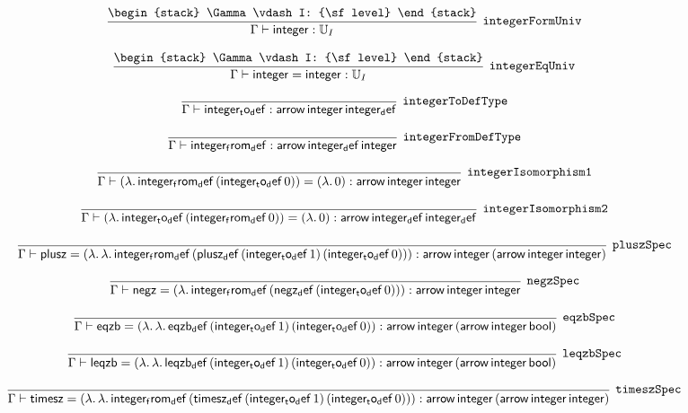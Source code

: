 \[
\infer[{\tt integerFormUniv}]{\Gamma \vdash {\sf integer}: {\Bbb U}_{I}}{
\begin{stack}
\Gamma \vdash I: {\sf level}
\end{stack}}
\]

\[
\infer[{\tt integerEqUniv}]{\Gamma \vdash {\sf integer}= {\sf integer}: {\Bbb U}_{I}}{
\begin{stack}
\Gamma \vdash I: {\sf level}
\end{stack}}
\]

\[
\infer[{\tt integerToDefType}]{\Gamma \vdash {\sf integer_to_def}: {\sf arrow}\,{\sf integer}\,{\sf integer_def}}{}
\]

\[
\infer[{\tt integerFromDefType}]{\Gamma \vdash {\sf integer_from_def}: {\sf arrow}\,{\sf integer_def}\,{\sf integer}}{}
\]

\[
\infer[{\tt integerIsomorphism1}]{\Gamma \vdash (\lambda .\,{\sf integer_from_def}\,({\sf integer_to_def}\,0))= (\lambda .\,0): {\sf arrow}\,{\sf integer}\,{\sf integer}}{}
\]

\[
\infer[{\tt integerIsomorphism2}]{\Gamma \vdash (\lambda .\,{\sf integer_to_def}\,({\sf integer_from_def}\,0))= (\lambda .\,0): {\sf arrow}\,{\sf integer_def}\,{\sf integer_def}}{}
\]

\[
\infer[{\tt pluszSpec}]{\Gamma \vdash {\sf plusz}= (\lambda .\,\lambda .\,{\sf integer_from_def}\,({\sf plusz_def}\,({\sf integer_to_def}\,1)\,({\sf integer_to_def}\,0))): {\sf arrow}\,{\sf integer}\,({\sf arrow}\,{\sf integer}\,{\sf integer})}{}
\]

\[
\infer[{\tt negzSpec}]{\Gamma \vdash {\sf negz}= (\lambda .\,{\sf integer_from_def}\,({\sf negz_def}\,({\sf integer_to_def}\,0))): {\sf arrow}\,{\sf integer}\,{\sf integer}}{}
\]

\[
\infer[{\tt eqzbSpec}]{\Gamma \vdash {\sf eqzb}= (\lambda .\,\lambda .\,{\sf eqzb_def}\,({\sf integer_to_def}\,1)\,({\sf integer_to_def}\,0)): {\sf arrow}\,{\sf integer}\,({\sf arrow}\,{\sf integer}\,{\sf bool})}{}
\]

\[
\infer[{\tt leqzbSpec}]{\Gamma \vdash {\sf leqzb}= (\lambda .\,\lambda .\,{\sf leqzb_def}\,({\sf integer_to_def}\,1)\,({\sf integer_to_def}\,0)): {\sf arrow}\,{\sf integer}\,({\sf arrow}\,{\sf integer}\,{\sf bool})}{}
\]

\[
\infer[{\tt timeszSpec}]{\Gamma \vdash {\sf timesz}= (\lambda .\,\lambda .\,{\sf integer_from_def}\,({\sf timesz_def}\,({\sf integer_to_def}\,1)\,({\sf integer_to_def}\,0))): {\sf arrow}\,{\sf integer}\,({\sf arrow}\,{\sf integer}\,{\sf integer})}{}
\]

